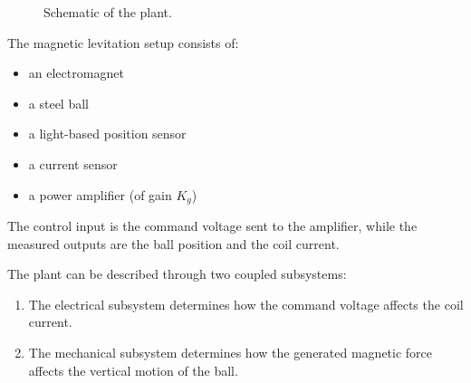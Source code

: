 \begin{figure}[H]
{%
    }
    \caption{Schematic of the plant.}
    \label{fig:maglev_plant_scheme}
\end{figure}


The magnetic levitation setup consists of:
\begin{itemize}
    \item an electromagnet
    \item a steel ball
    \item a light-based position sensor
    \item a current sensor
    \item a power amplifier (of gain $K_g$)
\end{itemize}
The control input is the command voltage sent to the amplifier, while the measured outputs are the ball position and the coil current.

The plant can be described through two coupled subsystems:
\begin{enumerate}
    \item The electrical subsystem determines how the command voltage affects the coil current.
    \item The mechanical subsystem determines how the generated magnetic force affects the vertical motion of the ball.
\end{enumerate}
 
